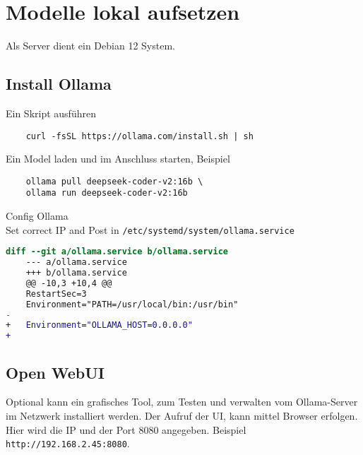 
\section{Modelle lokal aufsetzen}
Als Server dient ein Debian 12 System.

\subsection{Install Ollama}
Ein Skript ausführen
\begin{verbatim}
	curl -fsSL https://ollama.com/install.sh | sh
\end{verbatim}

Ein Model laden und im Anschluss starten, Beispiel
\begin{verbatim}
	ollama pull deepseek-coder-v2:16b \
	ollama run deepseek-coder-v2:16b
\end{verbatim}


Config Ollama\\
Set correct IP and Post in \texttt{/etc/systemd/system/ollama.service}

\begin{lstlisting}[language=diff,caption={Ollama Hostanpasssng für Netzwerkbetrieb}]
	diff --git a/ollama.service b/ollama.service
	--- a/ollama.service
	+++ b/ollama.service
	@@ -10,3 +10,4 @@
	RestartSec=3
	Environment="PATH=/usr/local/bin:/usr/bin"
-   
+   Environment="OLLAMA_HOST=0.0.0.0"
+   
\end{lstlisting}



\subsection{Open WebUI}
Optional kann ein grafisches Tool, zum Testen und verwalten vom Ollama-Server im Netzwerk installiert werden. Der Aufruf der UI, kann mittel Browser erfolgen. Hier wird die IP und der Port 8080 angegeben. Beispiel \texttt{http://192.168.2.45:8080}.

